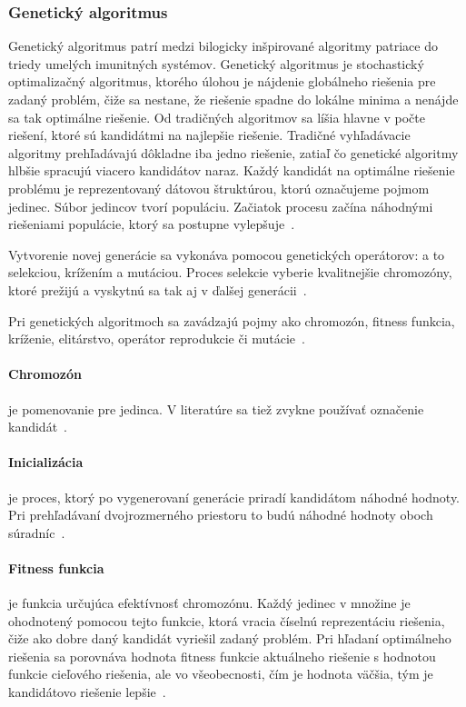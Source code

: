 \documentclass[a4paper,slovak,12pt,appendix]{article}
\begin{document}
\subsubsection{Genetický algoritmus}
Genetický algoritmus patrí medzi bilogicky inšpirované algoritmy patriace do
triedy umelých imunitných systémov. Genetický algoritmus je stochastický
optimalizačný algoritmus, ktorého úlohou je nájdenie globálneho riešenia pre
zadaný problém, čiže sa nestane, že riešenie spadne do lokálne minima a nenájde
sa tak optimálne riešenie. Od tradičných algoritmov sa líšia hlavne v počte
riešení, ktoré sú kandidátmi na najlepšie riešenie. Tradičné vyhľadávacie
algoritmy prehľadávajú dôkladne iba jedno riešenie, zatiaľ čo genetické
algoritmy hlbšie spracujú viacero kandidátov naraz. Každý kandidát na optimálne
riešenie problému je reprezentovaný dátovou štruktúrou, ktorú označujeme pojmom
jedinec. Súbor jedincov tvorí populáciu. Začiatok procesu začína náhodnými
riešeniami populácie, ktorý sa postupne vylepšuje~\cite{Chavan2015}.

Vytvorenie novej generácie sa vykonáva pomocou genetických operátorov:
a to selekciou, krížením a mutáciou. Proces selekcie vyberie kvalitnejšie
chromozóny, ktoré prežijú a vyskytnú sa tak aj v ďalšej
generácii~\cite{Simonova2007}.

Pri genetických algoritmoch sa zavádzajú pojmy ako chromozón, fitness funkcia,
kríženie, elitárstvo, operátor reprodukcie či mutácie~\cite{Chavan2015}.

\paragraph{Chromozón} je pomenovanie pre jedinca. V literatúre sa tiež zvykne
používať označenie kandidát~\cite{Arun2016}.

\paragraph{Inicializácia} je proces, ktorý po vygenerovaní generácie priradí
kandidátom náhodné hodnoty. Pri prehľadávaní dvojrozmerného priestoru to budú
náhodné hodnoty oboch súradníc~\cite{Lazinica2009}.

\paragraph{Fitness funkcia} je funkcia určujúca efektívnosť chromozónu. Každý
jedinec v množine je ohodnotený pomocou tejto funkcie, ktorá vracia číselnú
reprezentáciu riešenia, čiže ako dobre daný kandidát vyriešil zadaný problém.
Pri hľadaní optimálneho riešenia sa porovnáva hodnota fitness funkcie aktuálneho
riešenie s hodnotou funkcie cieľového riešenia, ale vo všeobecnosti, čím je
hodnota väčšia, tým je kandidátovo riešenie
lepšie~\cite{Chavan2015, Lazinica2009, Simonova2007}.
\end{document}

